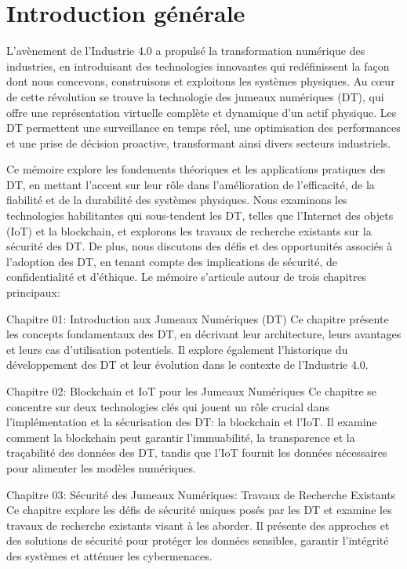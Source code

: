 \chapter*{Introduction générale }
\label{chap.intro}
L'avènement de l'Industrie 4.0 a propulsé la transformation numérique des industries, en introduisant des technologies innovantes qui redéfinissent la façon dont nous concevons, construisons et exploitons les systèmes physiques. Au cœur de cette révolution se trouve la technologie des jumeaux numériques (DT), qui offre une représentation virtuelle complète et dynamique d'un actif physique. Les DT permettent une surveillance en temps réel, une optimisation des performances et une prise de décision proactive, transformant ainsi divers secteurs industriels.

Ce mémoire explore les fondements théoriques et les applications pratiques des DT, en mettant l'accent sur leur rôle dans l'amélioration de l'efficacité, de la fiabilité et de la durabilité des systèmes physiques. Nous examinons les technologies habilitantes qui sous-tendent les DT, telles que l'Internet des objets (IoT) et la blockchain, et explorons les travaux de recherche existants sur la sécurité des DT. De plus, nous discutons des défis et des opportunités associés à l'adoption des DT, en tenant compte des implications de sécurité, de confidentialité et d'éthique.
Le mémoire s'articule autour de trois chapitres principaux:

Chapitre 01: Introduction aux Jumeaux Numériques (DT)
Ce chapitre présente les concepts fondamentaux des DT, en décrivant leur architecture, leurs avantages et leurs cas d'utilisation potentiels. Il explore également l'historique du développement des DT et leur évolution dans le contexte de l'Industrie 4.0.

Chapitre 02: Blockchain et IoT pour les Jumeaux Numériques Ce chapitre se concentre sur deux technologies clés qui jouent un rôle crucial dans l'implémentation et la sécurisation des DT: la blockchain et l'IoT. Il examine comment la blockchain peut garantir l'immuabilité, la transparence et la traçabilité des données des DT, tandis que l'IoT fournit les données nécessaires pour alimenter les modèles numériques.

Chapitre 03: Sécurité des Jumeaux Numériques: Travaux de Recherche Existants
Ce chapitre explore les défis de sécurité uniques posés par les DT et examine les travaux de recherche existants visant à les aborder. Il présente des approches et des solutions de sécurité pour protéger les données sensibles, garantir l'intégrité des systèmes et atténuer les cybermenaces.

